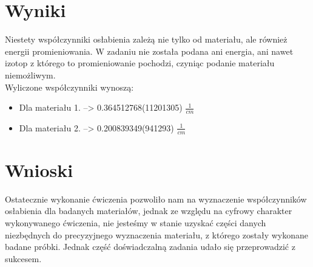 \documentclass{article}
\begin{document}
\section{Wyniki}
Niestety współczynniki osłabienia zależą nie tylko od materiału, ale również energii promieniowania. W zadaniu nie została podana ani energia, ani nawet izotop z którego to promieniowanie pochodzi, czyniąc podanie materiału niemożliwym. \\
Wyliczone współczynniki wynoszą:
\begin{itemize}
    \item Dla materiału 1. --> 0.364512768(11201305) $\frac{1}{cm} $
    \item Dla materiału 2. --> 0.200839349(941293) $\frac{1}{cm} $
\end{itemize}
\section{Wnioski}
Ostatecznie wykonanie ćwiczenia pozwoliło nam na wyznaczenie współczynników osłabienia dla badanych materiałów, jednak ze względu na cyfrowy charakter wykonywanego ćwiczenia, nie jesteśmy w stanie uzyskać części danych niezbędnych do precyzyjnego wyznaczenia materiału, z którego zostały wykonane badane próbki. Jednak część doświadczalną zadania udało się przeprowadzić z sukcesem.
\end{document}
